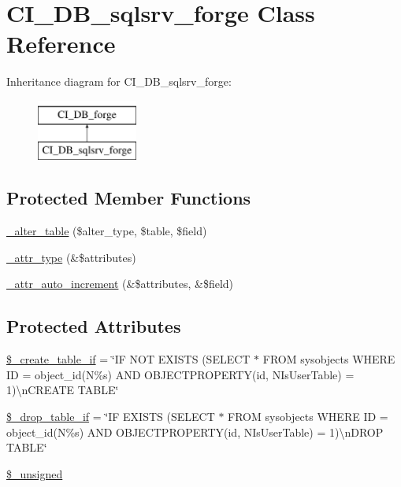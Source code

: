 \hypertarget{class_c_i___d_b__sqlsrv__forge}{}\section{C\+I\+\_\+\+D\+B\+\_\+sqlsrv\+\_\+forge Class Reference}
\label{class_c_i___d_b__sqlsrv__forge}
Inheritance diagram for C\+I\+\_\+\+D\+B\+\_\+sqlsrv\+\_\+forge\+:\begin{figure}[H]
\begin{center}
\leavevmode
\includegraphics[height=2.000000cm]{class_c_i___d_b__sqlsrv__forge}
\end{center}
\end{figure}
\subsection*{Protected Member Functions}
\begin{DoxyCompactItemize}
\item 
\hyperlink{class_c_i___d_b__sqlsrv__forge_a41c6cae02f2fda8b429ad0afb9509426}{\+\_\+alter\+\_\+table} (\$alter\+\_\+type, \$table, \$field)
\item 
\hyperlink{class_c_i___d_b__sqlsrv__forge_a8553be952084c6f7cdfff370a1d14f6b}{\+\_\+attr\+\_\+type} (\&\$attributes)
\item 
\hyperlink{class_c_i___d_b__sqlsrv__forge_a2a013a5932439c3c44f0dad3436525f7}{\+\_\+attr\+\_\+auto\+\_\+increment} (\&\$attributes, \&\$field)
\end{DoxyCompactItemize}
\subsection*{Protected Attributes}
\begin{DoxyCompactItemize}
\item 
\hyperlink{class_c_i___d_b__sqlsrv__forge_a2f6484fcb8d1dc3eef67a637227cd583}{\$\+\_\+create\+\_\+table\+\_\+if} = \char`\"{}I\+F N\+O\+T E\+X\+I\+S\+T\+S (S\+E\+L\+E\+C\+T $\ast$ F\+R\+O\+M sysobjects W\+H\+E\+R\+E I\+D = object\+\_\+id(N\textquotesingle{}\%s\textquotesingle{}) A\+N\+D O\+B\+J\+E\+C\+T\+P\+R\+O\+P\+E\+R\+T\+Y(id, N\textquotesingle{}Is\+User\+Table\textquotesingle{}) = 1)\textbackslash{}n\+C\+R\+E\+A\+T\+E T\+A\+B\+L\+E\char`\"{}
\item 
\hyperlink{class_c_i___d_b__sqlsrv__forge_a92a8a9145a7fc91e252e58d019373581}{\$\+\_\+drop\+\_\+table\+\_\+if} = \char`\"{}I\+F E\+X\+I\+S\+T\+S (S\+E\+L\+E\+C\+T $\ast$ F\+R\+O\+M sysobjects W\+H\+E\+R\+E I\+D = object\+\_\+id(N\textquotesingle{}\%s\textquotesingle{}) A\+N\+D O\+B\+J\+E\+C\+T\+P\+R\+O\+P\+E\+R\+T\+Y(id, N\textquotesingle{}Is\+User\+Table\textquotesingle{}) = 1)\textbackslash{}n\+D\+R\+O\+P T\+A\+B\+L\+E\char`\"{}
\item 
\hyperlink{class_c_i___d_b__sqlsrv__forge_aae977ae6d61fa183f0b25422b6ddc31c}{\$\+\_\+unsigned}
\end{DoxyCompactItemize}
